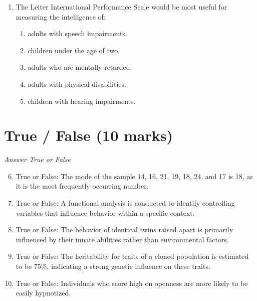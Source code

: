 \documentclass[12pt]{article}
\begin{document}
\begin{enumerate}[label=\arabic*.]
\begin{enumerate}[label=(\alph*)]
    \item Social media usage, internet browsing habits, television viewing preferences
    \item Intelligence, memory, reaction time
    \item Speech patterns, tone of voice, cadence
    \item Happiness, sadness, anger
\end{enumerate}
\item The Leiter International Performance Scale would be most useful for measuring the intelligence of:
\begin{enumerate}[label=(\alph*)]
    \item adults with speech impairments.
    \item children under the age of two.
    \item adults who are mentally retarded.
    \item adults with physical disabilities.
    \item children with hearing impairments.
\end{enumerate}
\end{enumerate}

\section*{True / False (10 marks)}
\textit{Answer True or False}
\begin{enumerate}[label=\arabic*.]
\setcounter{enumi}{5}
\item True or False: The mode of the sample 14, 16, 21, 19, 18, 24, and 17 is 18, as it is the most frequently occurring number.
\item True or False: A functional analysis is conducted to identify controlling variables that influence behavior within a specific context.
\item True or False: The behavior of identical twins raised apart is primarily influenced by their innate abilities rather than environmental factors.
\item True or False: The heritability for traits of a cloned population is estimated to be 75\%, indicating a strong genetic influence on these traits.
\item True or False: Individuals who score high on openness are more likely to be easily hypnotized.
\end{enumerate}
\end{document}
